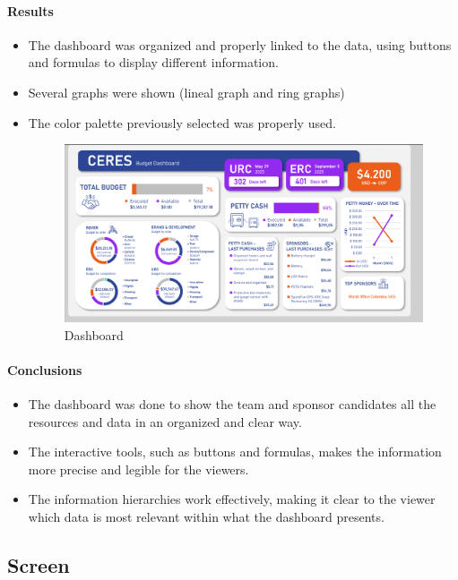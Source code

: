 \documentclass{article}
\begin{document}
\paragraph{Results}
\begin{itemize}
    \item The dashboard was organized and properly linked to the data, using buttons and formulas to display different information.
    \item Several graphs were shown (lineal graph and ring graphs)
    \item The color palette previously selected was properly used. 
    \begin{figure}[H]
        \centering
        \includegraphics[width=\linewidth]{Images/Design/DashBoardV1.png}
        \caption{Dashboard}
    \end{figure}
\end{itemize}


\paragraph{Conclusions}
\begin{itemize}
    \item The dashboard was done to show the team and sponsor candidates all the resources and data in an organized and clear way.
    \item The interactive tools, such as buttons and formulas, makes the information more precise and legible for the viewers.
    \item The information hierarchies work effectively, making it clear to the viewer which data is most relevant within what the dashboard presents.
    
\end{itemize}



\subsection{Screen}
\end{document}
